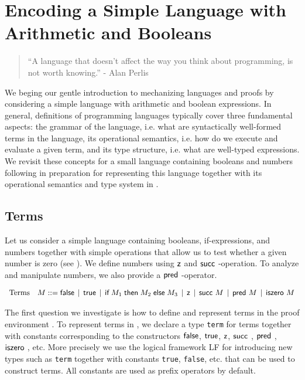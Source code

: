 

\chapter{Encoding a Simple Language with Arithmetic and Booleans}
\label{chap:basic}
\begin{quote}
``A language that doesn't affect the way you think about programming, is
not worth knowing.''
\hfill - Alan Perlis
\end{quote}

We beging our gentle introduction to mechanizing languages and proofs by
considering a simple language with arithmetic and boolean
expressions. In general, definitions of programming languages
typically cover three fundamental aspects:
the grammar  of the language,  i.e. what are syntactically  well-formed terms in
the language,  its operational semantics,  i.e. how do we execute and evaluate a
given term,  and its  type structure, i.e. what are  well-typed expressions.  We
revisit  these concepts  for  a small language  containing booleans  and numbers
following \citep[Ch 3,Ch 8]{TAPL} in  preparation for representing this language
together with its operational semantics and type system in \beluga.

\section{Terms}\label{sec:terms-basic}
Let  us  consider  a simple language  containing booleans,  if-expressions,  and
numbers together  with simple operations  that allow us  to test whether a given
number is zero (see \cite[Ch 3, Fig 3-1,Fig 3-2]{TAPL}). We define numbers using
$\textsf{z}$ and $\tmsucc$-operation.  To analyze  and manipulate numbers,  we also
provide a $\tmpred$-operator.

\[
\begin{array}{ll@{\bnfas}l}
\mbox{Terms} & M & \tmfalse \bnfalt \tmtrue \bnfalt \tmif{M_1}{M_2}{M_3} \bnfalt
\tmzero \bnfalt \tmsucc M \bnfalt \tmpred M \bnfalt \tmiszero M
\end{array}
\]

The first question  we investigate is  how to define  and represent terms in the
proof  environment  \beluga. To represent  terms  in \beluga,  we declare  a type
\lstinline!term!  for  terms   together  with  constants  corresponding  to  the
constructors    $\textsf{false}$,   $\textsf{true}$,    $\textsf{z}$,   $\tmsucc$,   $\tmpred$,
$\tmiszero$,  etc.   More   precisely   we   use   the   logical   framework  LF
\citep{Harper93jacm} for introducing new types such as \lstinline!term! together
with constants  \lstinline!true!,  \lstinline!false!, etc.  that  can be used to
construct terms. All constants are used as prefix operators by default.

